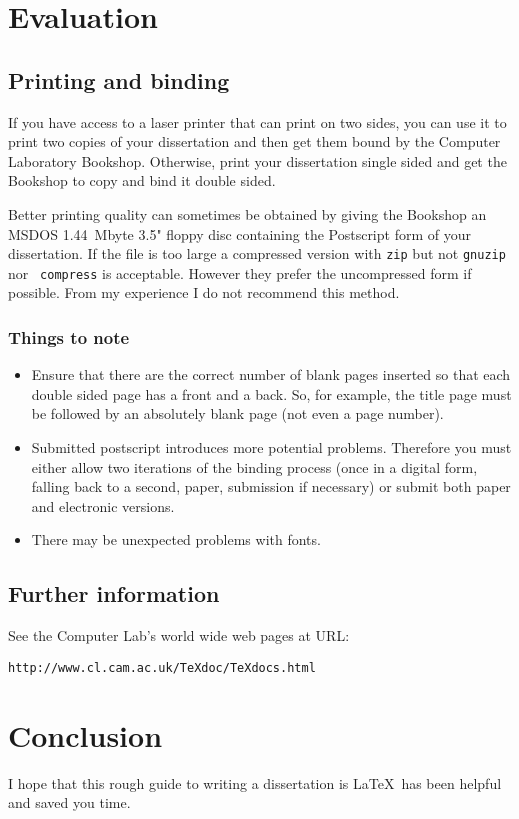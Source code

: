 \documentclass[12pt,twoside,notitlepage]{report}
\begin{document}
\cleardoublepage

\chapter{Evaluation}

\section{Printing and binding}

If you have access to a laser printer that can print on two sides, you
can use it to print two copies of your dissertation and then get them
bound by the Computer Laboratory Bookshop. Otherwise, print your
dissertation single sided and get the Bookshop to copy and bind it double
sided.


Better printing quality can sometimes be obtained by giving the
Bookshop an MSDOS 1.44~Mbyte 3.5" floppy disc containing the
Postscript form of your dissertation. If the file is too large a
compressed version with {\tt zip} but not {\tt gnuzip} nor {\tt
compress} is acceptable. However they prefer the uncompressed form if
possible. From my experience I do not recommend this method.

\subsection{Things to note}

\begin{itemize}
\item Ensure that there are the correct number of blank pages inserted
so that each double sided page has a front and a back.  So, for
example, the title page must be followed by an absolutely blank page
(not even a page number).

\item Submitted postscript introduces more potential problems.
Therefore you must either allow two iterations of the binding process
(once in a digital form, falling back to a second, paper, submission if
necessary) or submit both paper and electronic versions.

\item There may be unexpected problems with fonts.

\end{itemize}

\section{Further information}

See the Computer Lab's world wide web pages at URL:

{\tt http://www.cl.cam.ac.uk/TeXdoc/TeXdocs.html}


\cleardoublepage
\chapter{Conclusion}

I hope that this rough guide to writing a dissertation is \LaTeX\ has
been helpful and saved you time.
\end{document}

